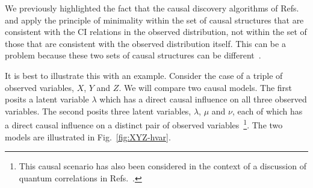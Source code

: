 \documentclass[12pt,onecolumn,nofootinbib]{revtex4-2}
\begin{document}
We previously highlighted the fact that the causal discovery algorithms of Refs.~\cite{Pearl2009} and \cite{Spirtes2001} apply the principle of minimality within the set of causal structures that are consistent with the CI relations in the observed distribution, not within the set of those that are consistent with the observed distribution itself.  This can be a problem because these two sets of causal structures can be different~\cite{Verma1993}.

It is best to illustrate this with an example.  Consider the case of a triple of observed variables, $X$, $Y$ and $Z$.  We will compare two causal models.  The first posits a latent variable $\lambda$ which has a direct causal influence on all three observed variables.  The second posits three latent variables, $\lambda$, $\mu$ and $\nu$, each of which has a direct causal influence on a distinct pair of observed variables~\footnote{This causal scenario has also been considered in the context of a discussion of quantum correlations in Refs.~\cite{Branciard,Fritz2012}.}.  The two models are illustrated in Fig.~\ref{fig:XYZ-hvar}.
\end{document}
